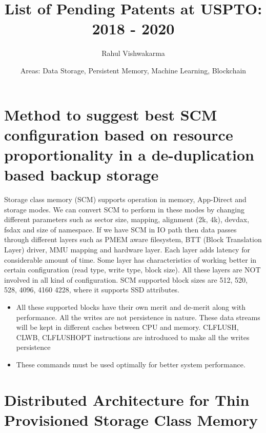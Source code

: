 \documentclass{article}
\begin{document}
\title{List of Pending Patents at USPTO: 2018 - 2020}
\date{Areas: Data Storage, Persistent Memory, Machine Learning, Blockchain}
\author{Rahul Vishwakarma}

\maketitle
{}
\newpage
{}

\section{Method to suggest best SCM configuration based on resource proportionality in a de-duplication based backup storage}

Storage class memory (SCM) supports operation in
memory, App-Direct and storage modes. We can
convert SCM to perform in these modes by changing
different parameters such as sector size, mapping,
alignment (2k, 4k), devdax, fsdax and size of
namespace.
If we have SCM in IO path then data passes through
different layers such as PMEM aware filesystem, BTT
(Block Translation Layer) driver, MMU mapping and
hardware layer. Each layer adds latency for
considerable amount of time. Some layer has
characteristics of working better in certain configuration
(read type, write type, block size). All these layers
are NOT involved in all kind of configuration.
SCM supported block sizes are 512, 520, 528, 4096,
4160 4228, where it supports SSD attributes.  

\begin{itemize} \itemsep 1pt

\item {All these supported blocks have their own merit and de-merit along with performance.
All the writes are not persistence in nature. These data streams will be kept in different caches between CPU and memory. CLFLUSH, CLWB, CLFLUSHOPT instructions are introduced to make all the writes persistence}  

\item {These commands must be used optimally for better system performance.}

\end{itemize}


\section{Distributed Architecture for Thin Provisioned Storage Class Memory}
\end{document}
